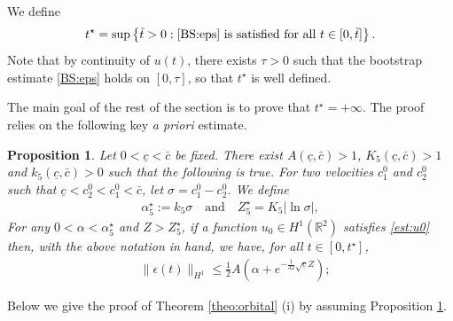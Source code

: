 \documentclass[reqno,10pt]{amsart}
\newtheorem{propo}[lemm]{Proposition}
\numberwithin{equation}{section}
\begin{document}
We define 
\begin{equation}
t^{\star}=\sup \left\{ \tilde{t}> 0 : \eqref{BS:eps} \ \text{is satisfied for all} \ t \in [0,\tilde{t}] \right\} .
\end{equation}
Note that by continuity of $u(t)$, there exists $\tau>0$ such that the bootstrap estimate \eqref{BS:eps} holds on $[0,\tau]$, so that $t^{\star}$ is well defined. 

The main goal of the rest of the section is to prove that $t^{\star}=+\infty$. The proof relies on the following key \textit{a priori} estimate. 

\begin{propo}\label{propo:a_priori}
Let  $0< \underline{c}< \bar{c}$ be fixed.
There exist $A(\underline{c}, \bar{c})>1$, $K_5(\underline{c}, \bar{c})>1$ and $k_5(\underline{c},\bar{c})>0$ such that the following is true. For two velocities $c_1^ 0$ and $c_2^0$ such that $\underline{c} < c_2^0 <c_1^0 < \bar{c}$, let $\sigma=c_1^0-c_2^0$. We define
\begin{align}\label{defi:alpha_5}
	\alpha_5^\star := k_5\sigma \quad \text{and} \quad Z_5^{\star}= K_5 |\ln \sigma|,
\end{align}
For any $0<\alpha<\alpha_5^\star$ and $Z>Z_5^{\star}$, if a function $u_0\in H^1(\mathbb{R}^2)$ satisfies \eqref{est:u0}
then, with the above notation in hand, we have, for all $t \in [0,t^{\star}]$,
\begin{align} 
&\|\epsilon(t)\|_{H^1} \leq \frac12 A \left( \alpha + e^{-\frac{1}{32} \sqrt{\underline{c}}Z }  \right) ; \label{a_priori.1} %
\end{align}
\end{propo}


Below we give the proof of Theorem \ref{theo:orbital} (i) by assuming Proposition \ref{propo:a_priori}. 
\end{document}
